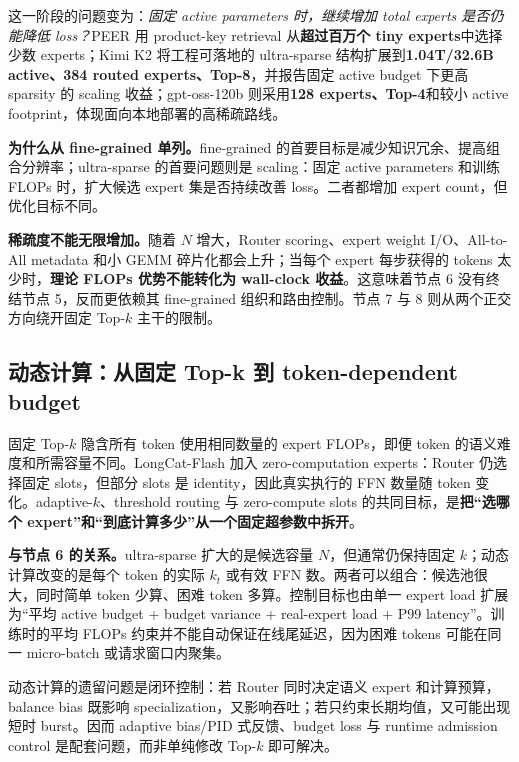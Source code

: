 \documentclass[10pt,a4paper,fontset=none]{ctexart}
\newcommand{\term}[1]{\textbf{#1}}
\begin{document}
这一阶段的问题变为：\emph{固定 active parameters 时，继续增加 total experts 是否仍能降低 loss？}PEER 用 product-key retrieval 从\textbf{超过百万个 tiny experts}中选择少数 experts\cite{he2024peer}；Kimi K2 将工程可落地的 ultra-sparse 结构扩展到\textbf{1.04T/32.6B active、384 routed experts、Top-8}，并报告固定 active budget 下更高 sparsity 的 scaling 收益\cite{kimiK2}；gpt-oss-120b 则采用\textbf{128 experts、Top-4}和较小 active footprint，体现面向本地部署的高稀疏路线\cite{openaiGptOss}。

\textbf{为什么从 fine-grained 单列。}fine-grained 的首要目标是减少知识冗余、提高组合分辨率；ultra-sparse 的首要问题则是 scaling：固定 active parameters 和训练 FLOPs 时，扩大候选 expert 集是否持续改善 loss。二者都增加 expert count，但优化目标不同。

\term{稀疏度不能无限增加。}随着 $N$ 增大，Router scoring、expert weight I/O、All-to-All metadata 和小 GEMM 碎片化都会上升；当每个 expert 每步获得的 tokens 太少时，\textbf{理论 FLOPs 优势不能转化为 wall-clock 收益}。这意味着节点 6 没有终结节点 5，反而更依赖其 fine-grained 组织和路由控制。节点 7 与 8 则从两个正交方向绕开固定 Top-$k$ 主干的限制。

\subsection{动态计算：从固定 Top-k 到 token-dependent budget}

固定 Top-$k$ 隐含所有 token 使用相同数量的 expert FLOPs，即便 token 的语义难度和所需容量不同。LongCat-Flash 加入 zero-computation experts：Router 仍选择固定 slots，但部分 slots 是 identity，因此真实执行的 FFN 数量随 token 变化\cite{longcatFlash}。adaptive-$k$、threshold routing 与 zero-compute slots 的共同目标，是\term{把“选哪个 expert”和“到底计算多少”从一个固定超参数中拆开}。

\textbf{与节点 6 的关系。}ultra-sparse 扩大的是候选容量 $N$，但通常仍保持固定 $k$；动态计算改变的是每个 token 的实际 $k_t$ 或有效 FFN 数。两者可以组合：候选池很大，同时简单 token 少算、困难 token 多算。控制目标也由单一 expert load 扩展为“平均 active budget + budget variance + real-expert load + P99 latency”。训练时的平均 FLOPs 约束并不能自动保证在线尾延迟，因为困难 tokens 可能在同一 micro-batch 或请求窗口内聚集。

动态计算的遗留问题是闭环控制：若 Router 同时决定语义 expert 和计算预算，balance bias 既影响 specialization，又影响吞吐；若只约束长期均值，又可能出现短时 burst。因而 adaptive bias/PID 式反馈、budget loss 与 runtime admission control 是配套问题，而非单纯修改 Top-$k$ 即可解决。
\end{document}
